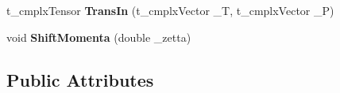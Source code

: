 \begin{DoxyCompactItemize}
\item 
\hypertarget{class_c___kinematics__1loop_a45b0eef2d7c9f649c233db2ce066dc4d}{t\-\_\-cmplx\-Tensor {\bfseries Trans\-In} (t\-\_\-cmplx\-Vector \-\_\-\-T, t\-\_\-cmplx\-Vector \-\_\-\-P)}\label{class_c___kinematics__1loop_a45b0eef2d7c9f649c233db2ce066dc4d}

\item 
\hypertarget{class_c___kinematics__1loop_aaa11f269ac21aecf200909d0396ab3cd}{void {\bfseries Shift\-Momenta} (double \-\_\-zetta)}\label{class_c___kinematics__1loop_aaa11f269ac21aecf200909d0396ab3cd}

\end{DoxyCompactItemize}
\subsection*{Public Attributes}
